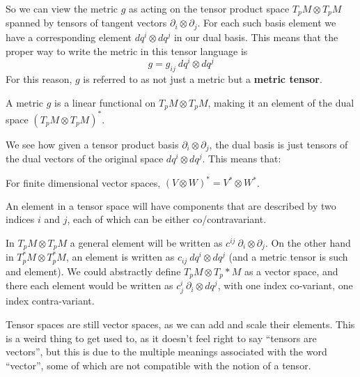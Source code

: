 	So we can view the metric $g$ as acting on the tensor product space $T_p M \otimes T_p M$ spanned by tensors of tangent vectors $\partial_i \otimes \partial_j$. For each such basis element we have a corresponding element $dq^i \otimes dq^j$ in our dual basis. This means that the proper way to write the metric in this tensor language is 
	\begin{equation}
		g = g_{ij} ~ dq^i \otimes dq^j
	\end{equation}
	For this reason, $g$ is referred to as not just a metric but a \textbf{metric tensor}.
	\begin{obs}
		A metric $g$ is a linear functional on $T_p M \otimes T_p M$, making it an element of the dual space $(T_p M \otimes T_p M)^*$.
	\end{obs}
	We see how given a tensor product basis $\partial_i \otimes \partial_j$, the dual basis is just tensors of the dual vectors of the original space $dq^i \otimes dq^j$. This means that: 
	\begin{obs}
		For finite dimensional vector spaces, $(V\otimes W)^* = V^* \otimes W^*$.
	\end{obs}
	An element in a tensor space will have components that are described by two indices $i$ and $j$, each of which can be either co/contravariant. 
	\begin{example}
		In $T_p M \otimes T_p M$ a general element will be written as $c^{ij} ~\partial_i \otimes \partial_j$. On the other hand in $T_p^* M \otimes T_p^* M$, an element is written as $c_{ij}~dq^i \otimes dq^j$ (and a metric tensor is such and element). We could abstractly define $T_p M \otimes T_p* M$ as a vector space, and there each element would be written as $c^i_j~\partial_i \otimes dq^j$, with one index co-variant, one index contra-variant.
	\end{example}
	
	\begin{nb}
		Tensor spaces are still vector spaces, as we can add and scale their elements. This is a weird thing to get used to, as it doesn't feel right to say ``tensors are vectors'', but this is due to the multiple meanings associated with the word ``vector'', some of which are not compatible with the notion of a tensor.
	\end{nb}


